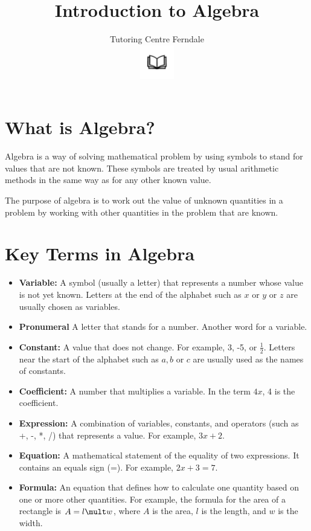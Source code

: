 \documentclass[12pt]{article}
\title{Introduction to Algebra}\\
\author{Tutoring Centre Ferndale\\
\includegraphics[width=4em]{ApS_logo.png}}
\date{}
\begin{document}
\maketitle

\section*{What is Algebra?}

Algebra is a way of solving mathematical problem by using symbols to stand for values that are not known. These symbols are treated by usual arithmetic methods in the same way as for any other known value.

The purpose of algebra is to work out the value of unknown quantities in a problem by working with other quantities in the problem that are known.

\section*{Key Terms in Algebra}

\begin{itemize}
    \item \textbf{Variable:} A symbol (usually a letter) that represents a number whose value is not yet known. Letters at the end of the alphabet such as $x$ or $y$ or $z$ are usually chosen as variables.
    \item \textbf{Pronumeral} A letter that stands for a number. Another word for a variable.
    \item \textbf{Constant:} A value that does not change. For example, 3, -5, or \(\frac{1}{2}\). Letters near the start of the alphabet such as $a, b$ or $c$ are usually used as the names of constants.
    \item \textbf{Coefficient:} A number that multiplies a variable. In the term \( 4x \), 4 is the coefficient.
    \item \textbf{Expression:} A combination of variables, constants, and operators (such as +, -, *, /) that represents a value. For example, \( 3x + 2 \).
    \item \textbf{Equation:} A mathematical statement of the equality of two expressions. It contains an equals sign (=). For example, \( 2x + 3 = 7 \).
    \item \textbf{Formula:} An equation that defines how to calculate one quantity based on one or more other quantities. For example, the formula for the area of a rectangle is $A=l\mult w$, where $A$ is the area, $l$ is the length, and $w$ is the width.
\end{itemize}
\end{document}
